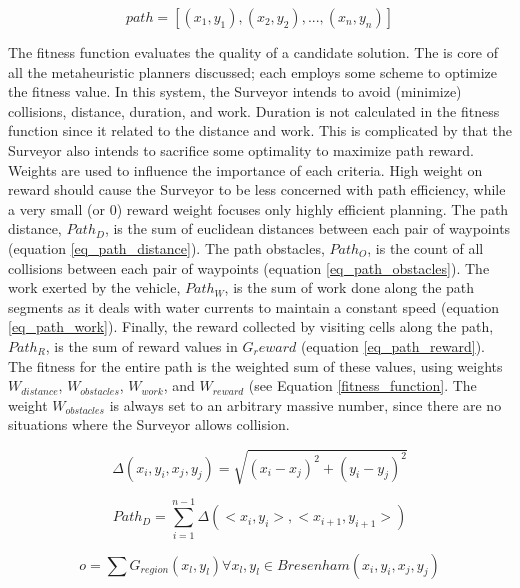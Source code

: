 \documentclass{tamuccthesis}
\begin{document}
\begin{equation}
path = [ (x_{1}, y_{1}), (x_{2}, y_{2}), ..., (x_{n}, y_{n}) ]
\label{solution_path}
\end{equation}

The fitness function evaluates the quality of a candidate solution. The is core of all the metaheuristic planners discussed; each employs some scheme to optimize the fitness value. In this system, the Surveyor intends to avoid (minimize) collisions, distance, duration, and work. Duration is not calculated in the fitness function since it related to the distance and work. This is complicated by that the Surveyor also intends to sacrifice some optimality to maximize path reward. Weights are used to influence the importance of each criteria. High weight on reward should cause the Surveyor to be less concerned with path efficiency, while a very small (or 0) reward weight focuses only highly efficient planning. The path distance, $Path_D$, is the sum of euclidean distances between each pair of waypoints (equation \ref{eq_path_distance}). The path obstacles, $Path_O$, is the count of all collisions between each pair of waypoints (equation \ref{eq_path_obstacles}). The work exerted by the vehicle, $Path_W$, is the sum of work done along the path segments as it deals with water currents to maintain a constant speed (equation \ref{eq_path_work}). Finally, the reward collected by visiting cells along the path, $Path_R$, is the sum of reward values in $G_reward$ (equation \ref{eq_path_reward}). The fitness for the entire path is the weighted sum of these values, using weights $W_{distance}$, $W_{obstacles}$, $W_{work}$, and $W_{reward}$ (see Equation \ref{fitness_function}. The weight $W_{obstacles}$ is always set to an arbitrary massive number, since there are no situations where the Surveyor allows collision. 

\begin{equation}
\Delta (x_{i}, y_{i}, x_{j}, y_{j}) = \sqrt{(x_{i} - x_{j})^2 + (y_{i} - y_{j})^2}
\label{eq_distance}
\end{equation}

\begin{equation}
Path_{D} = \sum_{i=1}^{n-1} \Delta (<x_{i}, y_{i}>, <x_{i+1}, y_{i+1}>)
\label{eq_path_distance}
\end{equation}


\begin{equation}
o = \sum G_{region}(x_l, y_l) \forall x_l, y_l \in Bresenham(x_i, y_i, x_j, y_j)
\label{eq_obstacles}
\end{equation}
\end{document}
